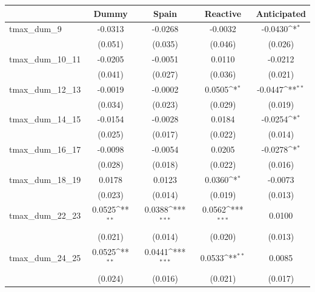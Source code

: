 {
\def\sym#1{\ifmmode^{#1}\else\(^{#1}\)\fi}
\begin{tabular}{l*{4}{c}}
\toprule
            &\multicolumn{1}{c}{Dummy}&\multicolumn{1}{c}{Spain}&\multicolumn{1}{c}{Reactive}&\multicolumn{1}{c}{Anticipated}\\
\midrule
tmax\_dum\_9  &     -0.0313         &     -0.0268         &     -0.0032         &     -0.0430\sym{*}  \\
            &     (0.051)         &     (0.035)         &     (0.046)         &     (0.026)         \\
tmax\_dum\_10\_11&     -0.0205         &     -0.0051         &      0.0110         &     -0.0212         \\
            &     (0.041)         &     (0.027)         &     (0.036)         &     (0.021)         \\
tmax\_dum\_12\_13&     -0.0019         &     -0.0002         &      0.0505\sym{*}  &     -0.0447\sym{**} \\
            &     (0.034)         &     (0.023)         &     (0.029)         &     (0.019)         \\
tmax\_dum\_14\_15&     -0.0154         &     -0.0028         &      0.0184         &     -0.0254\sym{*}  \\
            &     (0.025)         &     (0.017)         &     (0.022)         &     (0.014)         \\
tmax\_dum\_16\_17&     -0.0098         &     -0.0054         &      0.0205         &     -0.0278\sym{*}  \\
            &     (0.028)         &     (0.018)         &     (0.022)         &     (0.016)         \\
tmax\_dum\_18\_19&      0.0178         &      0.0123         &      0.0360\sym{*}  &     -0.0073         \\
            &     (0.023)         &     (0.014)         &     (0.019)         &     (0.013)         \\
tmax\_dum\_22\_23&      0.0525\sym{**} &      0.0388\sym{***}&      0.0562\sym{***}&      0.0100         \\
            &     (0.021)         &     (0.014)         &     (0.020)         &     (0.013)         \\
tmax\_dum\_24\_25&      0.0525\sym{**} &      0.0441\sym{***}&      0.0533\sym{**} &      0.0085         \\
            &     (0.024)         &     (0.016)         &     (0.021)         &     (0.017)         \\

\end{tabular}}
